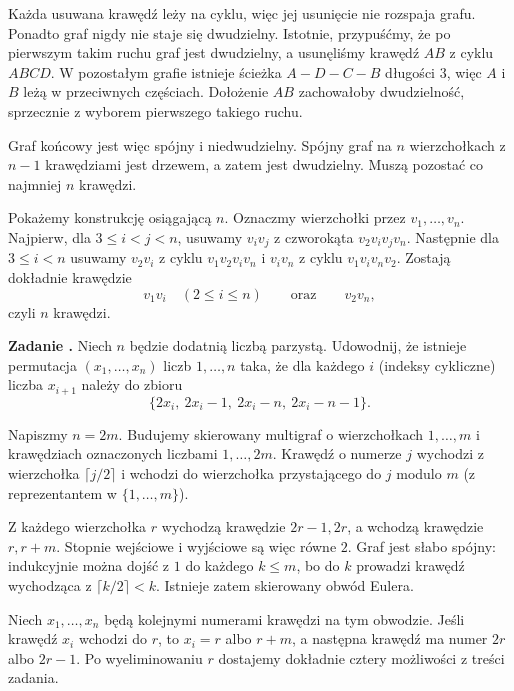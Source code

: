 \documentclass{lecture-kuznia}
\newcounter{zadanie}
\newenvironment{zadanie}[1]{%
	\refstepcounter{zadanie}%
	\par\medskip\noindent
	\textbf{Zadanie \thezadanie.}\quad
}{\par\medskip}
\begin{document}
\begin{solutionbox}
	Każda usuwana krawędź leży na cyklu, więc jej usunięcie nie rozspaja grafu.
	Ponadto graf nigdy nie staje się dwudzielny. Istotnie, przypuśćmy, że po
	pierwszym takim ruchu graf jest dwudzielny, a usunęliśmy krawędź $AB$ z
	cyklu $ABCD$. W pozostałym grafie istnieje ścieżka
	$A-D-C-B$ długości $3$, więc $A$ i $B$ leżą w przeciwnych częściach.
	Dołożenie $AB$ zachowałoby dwudzielność, sprzecznie z wyborem pierwszego
	takiego ruchu.

	Graf końcowy jest więc spójny i niedwudzielny. Spójny graf na $n$
	wierzchołkach z $n-1$ krawędziami jest drzewem, a zatem jest dwudzielny.
	Muszą pozostać co najmniej $n$ krawędzi.

	Pokażemy konstrukcję osiągającą $n$. Oznaczmy wierzchołki przez
	$v_1,\dots,v_n$. Najpierw, dla $3\leqslant i<j<n$, usuwamy $v_iv_j$ z
	czworokąta $v_2v_iv_jv_n$. Następnie dla $3\leqslant i<n$ usuwamy
	$v_2v_i$ z cyklu $v_1v_2v_iv_n$ i $v_iv_n$ z cyklu
	$v_1v_iv_nv_2$. Zostają dokładnie krawędzie
	\[
		v_1v_i\quad(2\leqslant i\leqslant n)
		\qquad\text{oraz}\qquad v_2v_n,
	\]
	czyli $n$ krawędzi.
\end{solutionbox}

\begin{zadanie}{trudne} %
	Niech $n$ będzie dodatnią liczbą parzystą. Udowodnij, że istnieje permutacja
	$(x_1,\dots,x_n)$ liczb $1,\dots,n$ taka, że dla każdego $i$ (indeksy
	cykliczne) liczba $x_{i+1}$ należy do zbioru
	\[
		\{2x_i,\ 2x_i-1,\ 2x_i-n,\ 2x_i-n-1\}.
	\]
\end{zadanie}

\begin{solutionbox}
	Napiszmy $n=2m$. Budujemy skierowany multigraf o wierzchołkach
	$1,\dots,m$ i krawędziach oznaczonych liczbami $1,\dots,2m$. Krawędź o
	numerze $j$ wychodzi z wierzchołka $\lceil j/2\rceil$ i wchodzi do
	wierzchołka przystającego do $j$ modulo $m$ (z reprezentantem w
	$\{1,\dots,m\}$).

	Z każdego wierzchołka $r$ wychodzą krawędzie $2r-1,2r$, a wchodzą
	krawędzie $r,r+m$. Stopnie wejściowe i wyjściowe są więc równe $2$.
	Graf jest słabo spójny: indukcyjnie można dojść z $1$ do każdego
	$k\leqslant m$, bo do $k$ prowadzi krawędź wychodząca z
	$\lceil k/2\rceil<k$. Istnieje zatem skierowany obwód Eulera.

	Niech $x_1,\dots,x_n$ będą kolejnymi numerami krawędzi na tym obwodzie.
	Jeśli krawędź $x_i$ wchodzi do $r$, to $x_i=r$ albo $r+m$, a następna
	krawędź ma numer $2r$ albo $2r-1$. Po wyeliminowaniu $r$ dostajemy dokładnie
	cztery możliwości z treści zadania.
\end{solutionbox}
\end{document}
